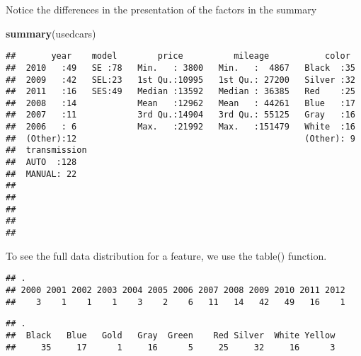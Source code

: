 \documentclass[]{article}
\newenvironment{Shaded}{\begin{snugshade}}{\end{snugshade}}
\newcommand{\KeywordTok}[1]{\textcolor[rgb]{0.13,0.29,0.53}{\textbf{#1}}}
\newcommand{\NormalTok}[1]{#1}
\newcommand{\OperatorTok}[1]{\textcolor[rgb]{0.81,0.36,0.00}{\textbf{#1}}}
\newcommand{\StringTok}[1]{\textcolor[rgb]{0.31,0.60,0.02}{#1}}
\begin{document}
Notice the differences in the presentation of the factors in the summary

\begin{Shaded}
\begin{Highlighting}[]
\KeywordTok{summary}\NormalTok{(usedcars)}
\end{Highlighting}
\end{Shaded}

\begin{verbatim}
##       year    model        price          mileage           color   
##  2010   :49   SE :78   Min.   : 3800   Min.   :  4867   Black  :35  
##  2009   :42   SEL:23   1st Qu.:10995   1st Qu.: 27200   Silver :32  
##  2011   :16   SES:49   Median :13592   Median : 36385   Red    :25  
##  2008   :14            Mean   :12962   Mean   : 44261   Blue   :17  
##  2007   :11            3rd Qu.:14904   3rd Qu.: 55125   Gray   :16  
##  2006   : 6            Max.   :21992   Max.   :151479   White  :16  
##  (Other):12                                             (Other): 9  
##  transmission
##  AUTO  :128  
##  MANUAL: 22  
##              
##              
##              
##              
## 
\end{verbatim}

To see the full data distribution for a feature, we use the {table()}
function.

\begin{Shaded}
\end{Shaded}

\begin{verbatim}
## .
## 2000 2001 2002 2003 2004 2005 2006 2007 2008 2009 2010 2011 2012 
##    3    1    1    1    3    2    6   11   14   42   49   16    1
\end{verbatim}

\begin{Shaded}
\end{Shaded}

\begin{verbatim}
## .
##  Black   Blue   Gold   Gray  Green    Red Silver  White Yellow 
##     35     17      1     16      5     25     32     16      3
\end{verbatim}
\end{document}
